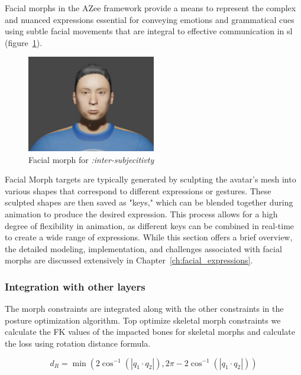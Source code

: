 \documentclass[../../main.tex]{subfiles}
\begin{document}
{Facial morphs in the AZee framework provide a means to represent the complex and nuanced expressions essential for conveying emotions and grammatical cues using subtle facial movements that are integral to effective communication in \gls{sl} (figure~\ref{fig:facial_example}).

\begin{figure}
    \centering
    \includegraphics[width=0.5\textwidth]{chapters/avatar_creation_pose_synthesis/images/facial_example.png}
    \caption{Facial morph for \emph{:inter-subjecitivty}}
    \label{fig:facial_example}
\end{figure}

Facial Morph targets are typically generated by sculpting the avatar's mesh into various shapes that correspond to different expressions or gestures. These sculpted shapes are then saved as "keys," which can be blended together during animation to produce the desired expression. This process allows for a high degree of flexibility in animation, as different keys can be combined in real-time to create a wide range of expressions. While this section offers a brief overview, the detailed modeling, implementation, and challenges associated with facial morphs are discussed extensively in Chapter~\ref{ch:facial_expressions}.

\subsubsection{Integration with other layers}
\label{ch:avatar_creation_pose_synthesis:proc_rig_signing_avatars:morph_constraints:intergation}

The morph constraints are integrated along with the other constraints in the posture optimization algorithm. Top optimize skeletal morph constraints we calculate the FK values of the impacted bones for skeletal morphs and calculate the loss using rotation distance formula.

\[
d_R = \min\left( 2 \cos^{-1}\left( \left| q_1 \cdot q_2 \right| \right), 2\pi - 2 \cos^{-1}\left( \left| q_1 \cdot q_2 \right| \right) \right)
\]

}
\end{document}
